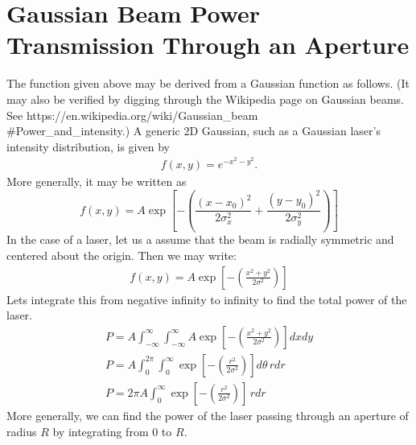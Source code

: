 \newpage
\section{Gaussian Beam Power Transmission Through an Aperture}
The function given above may be derived from a Gaussian function as follows. (It may also be verified by digging through the Wikipedia page on Gaussian beams. See https://en.wikipedia.org/wiki/Gaussian\_beam\\\#Power\_and\_intensity.) A generic 2D Gaussian, such as a Gaussian laser's intensity distribution, is given by 
\begin{gather}
    f(x,y) = e^{-x^2 - y^2}.
\end{gather}
More generally, it may be written as 
\begin{equation}
    f(x,y) = A \exp \left[-\left(\frac{(x-x_0)^2}{2\sigma_x^2} + \frac{(y-y_0)^2}{2\sigma^2_y} \right)\right]
\end{equation}
In the case of a laser, let us a assume that the beam is radially symmetric and centered about the origin. Then we may write:
\begin{gather}
    f(x,y) = A \exp \left[-\left(\frac{x^2+y^2}{2\sigma^2}\right)\right]
\end{gather}
Lets integrate this from negative infinity to infinity to find the total power of the laser.
\begin{gather}
    P= A \int^\infty_{-\infty} \int^\infty_{-\infty} A \exp \left[-\left(\frac{x^2+y^2}{2\sigma^2}\right)\right] dx dy\\
    P = A \int^{2\pi}_{0} \int^{\infty}_{0} \exp \left[-\left(\frac{r^2}{2\sigma^2}\right)\right] d\theta \, r dr\\
    P = 2\pi A \int^{\infty}_{0} \exp \left[-\left(\frac{r^2}{2\sigma^2}\right)\right] \, r dr
\end{gather}
More generally, we can find the power of the laser passing through an aperture of radius $R$ by integrating from 0 to $R$.
